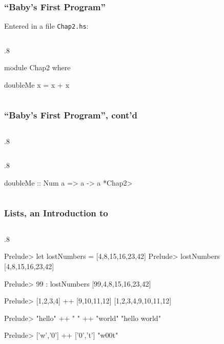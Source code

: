 \documentclass{beamer}
\newenvironment{codeblock}[1][.8]{%
\begin{columns}
\begin{column}{#1\linewidth}
\begin{exampleblock}{}}{%
\end{exampleblock}
\end{column}
\end{columns}}
\begin{document}
\begin{frame}[fragile]
\frametitle{``Baby's First Program''}

Entered in a file \verb+Chap2.hs+:
\begin{codeblock}
\begin{hcode}
module Chap2 where

doubleMe x = x + x  
\end{hcode}
\end{codeblock}

\end{frame}

\begin{frame}[fragile]
\frametitle{``Baby's First Program'', cont'd}
\begin{codeblock}
\end{codeblock}
\pause
\begin{codeblock}
\begin{hcode}
doubleMe :: Num a => a -> a
*Chap2> 
\end{hcode}
\end{codeblock}
\end{frame}


\begin{frame}[fragile]
\frametitle{Lists, an Introduction to}
\begin{codeblock}
\begin{hcode}
Prelude> let lostNumbers = [4,8,15,16,23,42] 
Prelude> lostNumbers
[4,8,15,16,23,42]

Prelude> 99 : lostNumbers
[99,4,8,15,16,23,42]

Prelude> [1,2,3,4] ++ [9,10,11,12]
[1,2,3,4,9,10,11,12]

Prelude> "hello" ++ " " ++ "world"
"hello world"

Prelude> ['w','0'] ++ ['0','t']
"w00t"
\end{hcode}
\end{codeblock}
\end{frame}
\end{document}
